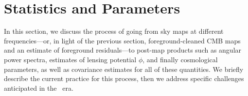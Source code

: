 \section{Statistics and Parameters}

In this section, we discuss the process of going from sky maps at different frequencies---or, in light
of the previous section, foreground-cleaned CMB maps and an estimate of foreground residuals---to
post-map products such as angular power spectra, estimates of lensing potential $\phi$, and finally
cosmological parameters, as well as covariance estimates for all of these quantities. We briefly describe
the current practice for this process, then we address specific challenges anticipated in the \cmbexp\ era.
%
%
%
%
%
%
%
%


